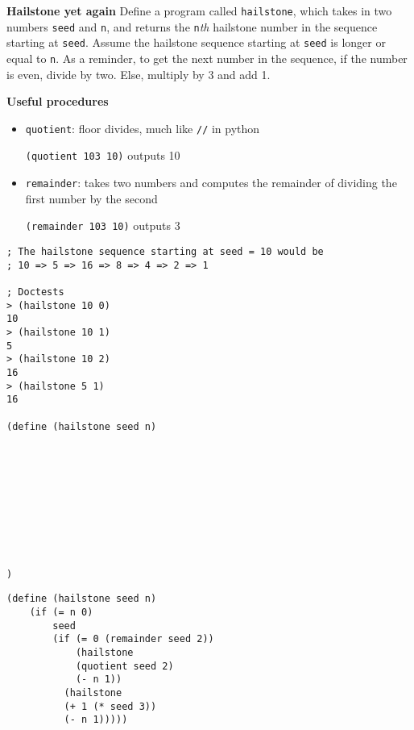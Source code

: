 \begin{blocksection}
\question \textbf{Hailstone yet again} Define a program called \lstinline$hailstone$,
which takes in two numbers \lstinline$seed$ and \lstinline$n$, and returns the
\lstinline$n$\emph{th} hailstone number in the sequence starting at \lstinline$seed$.
Assume the hailstone sequence starting at \lstinline$seed$ is longer or equal to
\lstinline$n$. As a reminder, to get the next number in the sequence, if the number
is even, divide by two. Else, multiply by 3 and add 1.

\textbf{Useful procedures}

\begin{itemize}
\item \lstinline$quotient$: floor divides, much like \lstinline$//$ in python

\lstinline$(quotient 103 10)$ outputs 10

\item \lstinline$remainder$: takes two numbers and computes the remainder of dividing the first number by the second

\lstinline$(remainder 103 10)$ outputs 3
\end{itemize}

\vspace{\baselineskip}
\begin{lstlisting}
; The hailstone sequence starting at seed = 10 would be
; 10 => 5 => 16 => 8 => 4 => 2 => 1

; Doctests
> (hailstone 10 0)
10
> (hailstone 10 1)
5
> (hailstone 10 2)
16
> (hailstone 5 1)
16

(define (hailstone seed n)










)
\end{lstlisting}
\end{blocksection}
\begin{blocksection}

\begin{solution}[.1in]
\begin{lstlisting}
(define (hailstone seed n)
    (if (= n 0)
        seed
        (if (= 0 (remainder seed 2))
            (hailstone
            (quotient seed 2)
            (- n 1))
          (hailstone
          (+ 1 (* seed 3))
          (- n 1)))))
\end{lstlisting}
\end{solution}
\end{blocksection}

